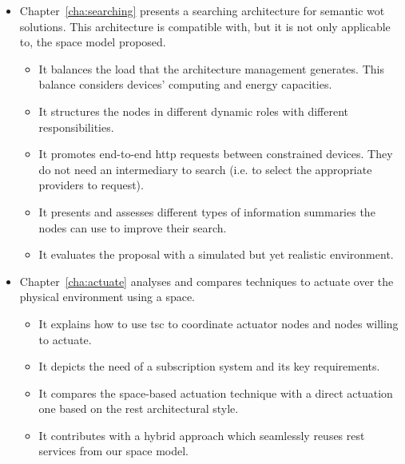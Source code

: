 \begin{itemize}
  \item Chapter~\ref{cha:searching} presents a searching architecture for semantic \ac{wot} solutions.
        This architecture is compatible with, but it is not only applicable to, the space model proposed.
    \begin{itemize}
      \item It balances the load that the architecture management generates.
	    This balance considers devices' computing and energy capacities.
      \item It structures the nodes in different dynamic roles with different responsibilities. %
      \item It promotes end-to-end \ac{http} requests between constrained devices.
            They do not need an intermediary to search (i.e. to select the appropriate providers to request). %
      \item It presents and assesses different types of information summaries the nodes can use to improve their search.
      \item It evaluates the proposal with a simulated but yet realistic environment.
    \end{itemize}
    
  \item Chapter~\ref{cha:actuate} analyses and compares techniques to actuate over the physical environment using a space. %
    \begin{itemize}
      \item It explains how to use \ac{tsc} to coordinate actuator nodes and nodes willing to actuate.
      \item It depicts the need of a subscription system and its key requirements.
      \item It compares the space-based actuation technique with a direct actuation one based on the \ac{rest} architectural style. %
      \item It contributes with a hybrid approach which seamlessly reuses \ac{rest} services from our space model.
    \end{itemize}
  

\end{itemize}
